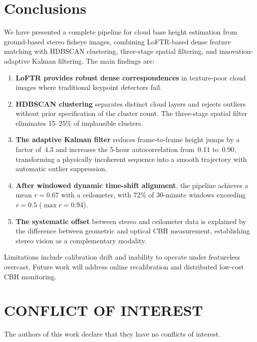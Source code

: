 \documentclass[preprint,
superscriptaddress,
amsmath,amssymb,aps,
twoside,final,secnumarabic,
nofootinbib]{revtex4-2}
\begin{document}
\section{Conclusions}\label{sec:conclusions}

We have presented a complete pipeline for cloud base height estimation from ground-based stereo fisheye images, combining LoFTR-based dense feature matching with HDBSCAN clustering, three-stage spatial filtering, and innovation-adaptive Kalman filtering. The main findings are:

\begin{enumerate}
\item \textbf{LoFTR provides robust dense correspondences} in texture-poor cloud images where traditional keypoint detectors fail.

\item \textbf{HDBSCAN clustering} separates distinct cloud layers and rejects outliers without prior specification of the cluster count. The three-stage spatial filter eliminates 15--25\% of implausible clusters.

\item \textbf{The adaptive Kalman filter} reduces frame-to-frame height jumps by a factor of~4.3 and increases the 5-hour autocorrelation from~0.11 to~0.90, transforming a physically incoherent sequence into a smooth trajectory with automatic outlier suppression.

\item \textbf{After windowed dynamic time-shift alignment}, the pipeline achieves a mean $r = 0.67$ with a ceilometer, with 72\% of 30-minute windows exceeding $r = 0.5$ ($\max r = 0.94$).

\item \textbf{The systematic offset} between stereo and ceilometer data is explained by the difference between geometric and optical CBH measurement, establishing stereo vision as a complementary modality.
\end{enumerate}

Limitations include calibration drift and inability to operate under featureless overcast. Future work will address online recalibration and distributed low-cost CBH monitoring.

\section*{CONFLICT OF INTEREST}
The authors of this work declare that they have no conflicts of interest.
\end{document}
